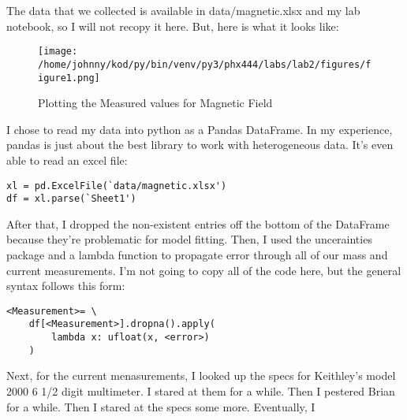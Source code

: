 \documentclass{article}
\begin{document}
The data that we collected is available in data/magnetic.xlsx 
and my lab notebook, so I will not recopy it here. But, here is what it looks
like:

\begin{figure}[H]
        \begin{center}
        \texttt{[image: /home/johnny/kod/py/bin/venv/py3/phx444/labs/lab2/figures/figure1.png]}
        \caption{Plotting the Measured values for Magnetic Field}
        \label{fig:fig_1}
        \end{center}
\end{figure}
I chose to read my data into python as a Pandas DataFrame. In my experience,
pandas is just about the best library to work with heterogeneous data. It's
even able to read an excel file:
\begin{center}
\begin{minipage}[t]{.75\textwidth}
\begin{lstlisting}[frame=tlrb]
xl = pd.ExcelFile(`data/magnetic.xlsx')
df = xl.parse(`Sheet1')
\end{lstlisting}
\end{minipage}
\end{center}
After that, I dropped the non-existent entries off the bottom of the DataFrame
because they're problematic for model fitting. Then, I used the uncerainties
package and a lambda function to propagate error through all of our mass and 
current measurements. I'm not going to copy all of the code here, but the
general syntax follows this form:
\begin{center}
\begin{minipage}[t]{.75\textwidth}
\begin{lstlisting}[frame=tlrb]
<Measurement>= \
    df[<Measurement>].dropna().apply(
        lambda x: ufloat(x, <error>)
    )
\end{lstlisting}
\end{minipage}
\end{center}
Next, for the current menasurements, I looked up the specs for
Keithley's model 2000 6 1/2 digit multimeter. I stared at them for a while.
Then I pestered Brian for a while. Then I stared at the specs some more. Eventually, I
\end{document}
